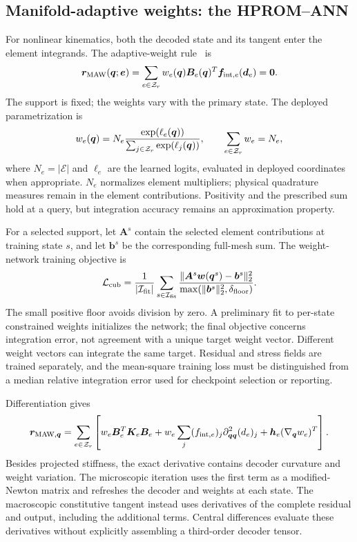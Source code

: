 \subsection{Manifold-adaptive weights: the HPROM--ANN}
For nonlinear kinematics, both the decoded state and its tangent enter the element integrands. The adaptive-weight rule~\cite{hernandez2026} is
\begin{equation}
 \bm r_{\rm MAW}(\bm q;\bm e)=
 \sum_{e\in\mathcal Z_r}w_e(\bm q)\bm B_e(\bm q)^T
                   \bm f_{{\rm int},e}(\bm d_e)=\bm0.
 \label{eq:maw}
\end{equation}
The support is fixed; the weights vary with the primary state. The deployed parametrization is
\begin{equation}
 w_e(\bm q)=N_e
       \frac{\exp(\ell_e(\bm q))}{\sum_{j\in\mathcal Z_r}\exp(\ell_j(\bm q))},
 \qquad \sum_{e\in\mathcal Z_r}w_e=N_e,
 \label{eq:softmax_weights}
\end{equation}
where $N_e=|\mathcal E|$ and $\ell_e$ are the learned logits, evaluated in deployed coordinates when appropriate. $N_e$ normalizes element multipliers; physical quadrature measures remain in the element contributions. Positivity and the prescribed sum hold at a query, but integration accuracy remains an approximation property.

For a selected support, let $\bm A^s$ contain the selected element contributions at training state $s$, and let $\bm b^s$ be the corresponding full-mesh sum. The weight-network training objective is
\begin{equation}
 \mathcal L_{\rm cub}=
 \frac{1}{|\mathcal I_{\rm fit}|}
 \sum_{s\in\mathcal I_{\rm fit}}
 \frac{\|\bm A^s\bm w(\bm q^s)-\bm b^s\|_2^2}
      {\max(\|\bm b^s\|_2^2,\delta_{\rm floor})}.
 \label{eq:adaptive_training}
\end{equation}
The small positive floor avoids division by zero. A preliminary fit to per-state constrained weights initializes the network; the final objective concerns integration error, not agreement with a unique target weight vector. Different weight vectors can integrate the same target. Residual and stress fields are trained separately, and the mean-square training loss must be distinguished from a median relative integration error used for checkpoint selection or reporting.

Differentiation gives
\begin{equation}
 \bm r_{{\rm MAW},\bm q}
 =\sum_{e\in\mathcal Z_r}
 \left[
 w_e\bm B_e^T\bm K_e\bm B_e
 +w_e\sum_j(f_{{\rm int},e})_j
           \partial^2_{\bm q\bm q}(d_e)_j
 +\bm h_e(\nabla_{\bm q}w_e)^T
 \right].
 \label{eq:maw_jacobian}
\end{equation}
Besides projected stiffness, the exact derivative contains decoder curvature and weight variation. The microscopic iteration uses the first term as a modified-Newton matrix and refreshes the decoder and weights at each state. The macroscopic constitutive tangent instead uses derivatives of the complete residual and output, including the additional terms. Central differences evaluate these derivatives without explicitly assembling a third-order decoder tensor.

